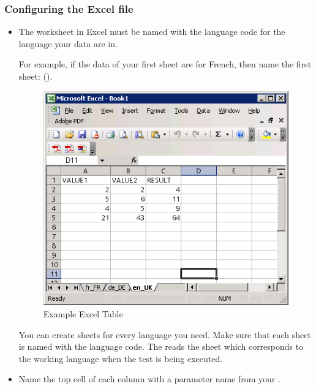 \subsubsection{Configuring the Excel file}
\label{TasksConfigureExcel}
\begin{itemize}
\item The worksheet in Excel must be named with the language code for the language your data are in. 

For example, if the data of your first sheet are for French, then name the first sheet:  ().

\begin{figure}[h]
\begin{center}
\includegraphics{Tasks/Testdata/PS/excelexample}
\caption{Example Excel Table}
\label{excel}
\end{center}
\end{figure}

You can create sheets for every language you need. Make sure that each sheet is named with the language code. The \ite{} reads the sheet which corresponds to the working language when the test is being executed. 

\item Name the top cell of each column with a parameter name from your \gdcase{}.


\end{itemize}
